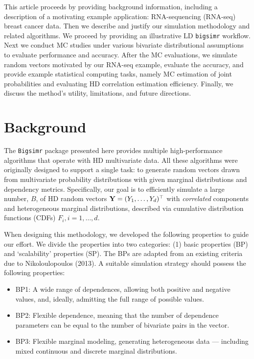 \documentclass{article}
\begin{document}
This article proceeds by providing background information, including a
description of a motivating example application: RNA-sequencing
(RNA-seq) breast cancer data. Then we describe and justify our
simulation methodology and related algorithms. We proceed by providing
an illustrative LD \texttt{bigsimr} workflow. Next we conduct MC studies
under various bivariate distributional assumptions to evaluate
performance and accuracy. After the MC evaluations, we simulate random
vectors motivated by our RNA-seq example, evaluate the accuracy, and
provide example statistical computing tasks, namely MC estimation of
joint probabilities and evaluating HD correlation estimation efficiency.
Finally, we discuss the method's utility, limitations, and future
directions.

\hypertarget{background}{%
\section{Background}\label{background}}

The \texttt{Bigsimr} package presented here provides multiple
high-performance algorithms that operate with HD multivariate data. All
these algorithms were originally designed to support a single task: to
generate random vectors drawn from multivariate probability
distributions with given marginal distributions and dependency metrics.
Specifically, our goal is to efficiently simulate a large number, \(B\),
of HD random vectors \({\bf Y}=(Y_1, \ldots, Y_d)^\top\) with
\emph{correlated} components and heterogeneous marginal distributions,
described via cumulative distribution functions (CDFs)
\(F_i, i=1,\ldots,d\).

When designing this methodology, we developed the following properties
to guide our effort. We divide the properties into two categories: (1)
basic properties (BP) and `scalability' properties (SP). The BPs are
adapted from an existing criteria due to Nikoloulopoulos (2013). A
suitable simulation strategy should possess the following properties:

\begin{itemize}
\tightlist
\item
  BP1: A wide range of dependences, allowing both positive and negative
  values, and, ideally, admitting the full range of possible values.
\item
  BP2: Flexible dependence, meaning that the number of dependence
  parameters can be equal to the number of bivariate pairs in the
  vector.
\item
  BP3: Flexible marginal modeling, generating heterogeneous data ---
  including mixed continuous and discrete marginal distributions.
\end{itemize}
\end{document}
